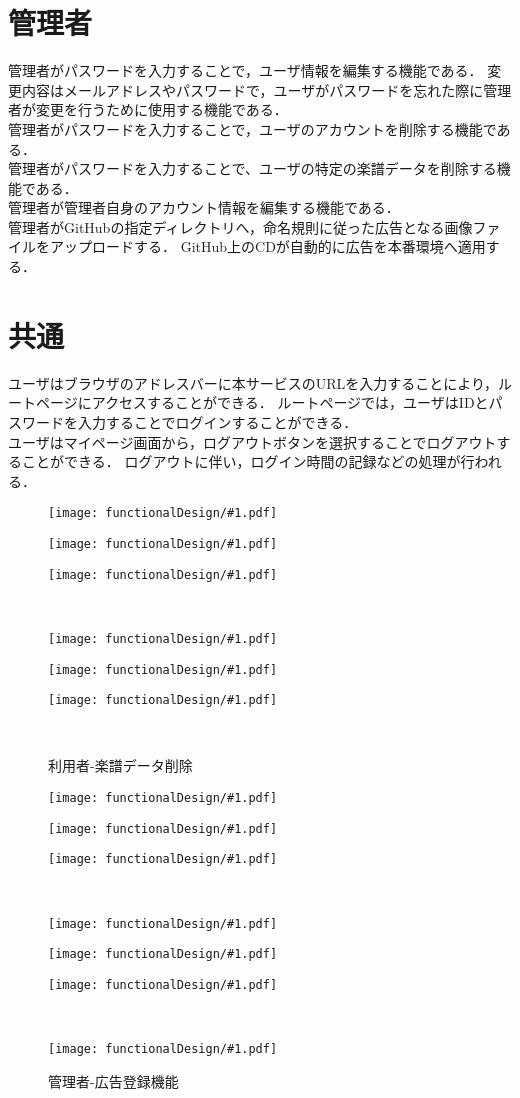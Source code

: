 \section{管理者}
管理者がパスワードを入力することで，ユーザ情報を編集する機能である．
変更内容はメールアドレスやパスワードで，ユーザがパスワードを忘れた際に管理者が変更を行うために使用する機能である．\\
管理者がパスワードを入力することで，ユーザのアカウントを削除する機能である．\\
管理者がパスワードを入力することで、ユーザの特定の楽譜データを削除する機能である．\\
管理者が管理者自身のアカウント情報を編集する機能である．\\
管理者がGitHubの指定ディレクトリへ，命名規則に従った広告となる画像ファイルをアップロードする．
GitHub上のCDが自動的に広告を本番環境へ適用する．
\section{共通}
ユーザはブラウザのアドレスバーに本サービスのURLを入力することにより，ルートページにアクセスすることができる．
ルートページでは，ユーザはIDとパスワードを入力することでログインすることができる．\\
ユーザはマイページ画面から，ログアウトボタンを選択することでログアウトすることができる．
ログアウトに伴い，ログイン時間の記録などの処理が行われる．
\newcommand{\icd}[2]{\begin{minipage}[b]{.32\textwidth}\centering\texttt{[image: functionalDesign/\#1.pdf]}\caption{#2}\label{#2}\end{minipage}}
\begin{figure}[p]
    \centering
    \icd{211-機能設計-利用者側-ユーザ登録}{利用者-ユーザ登録}
    \icd{212-機能設計-利用者側-ユーザ編集}{利用者-ユーザ編集}
    \icd{213-機能設計-利用者側-ユーザ削除}{利用者-ユーザ削除}\\
    \icd{214-機能設計-利用者側-楽譜データ登録}{利用者-楽譜データ登録}
    \icd{215-機能設計-利用者側-楽譜データ編集}{利用者-楽譜データ編集}
    \icd{216-機能設計-利用者側-楽譜データ削除}{利用者-楽譜データ削除}\\
\end{figure}
\begin{figure}[p]
    \centering
    \icd{221-機能設計-管理者側-ユーザ編集}{管理者-ユーザ編集}
    \icd{222-機能設計-管理者側-ユーザ削除}{管理者-ユーザ削除}
    \icd{223-機能設計-管理者側-楽譜データ削除}{管理者-楽譜データ削除}\\
    \icd{224-機能設計-管理者側-管理者情報編集機能}{管理者-管理者情報編集}
    \icd{217-機能設計-利用者側-ログイン}{共通-ログイン}
    \icd{218-機能設計-利用者側-ログアウト}{共通-ログアウト}\\
    \icd{225-機能設計-管理者側-広告登録機能}{管理者-広告登録機能}
\end{figure}